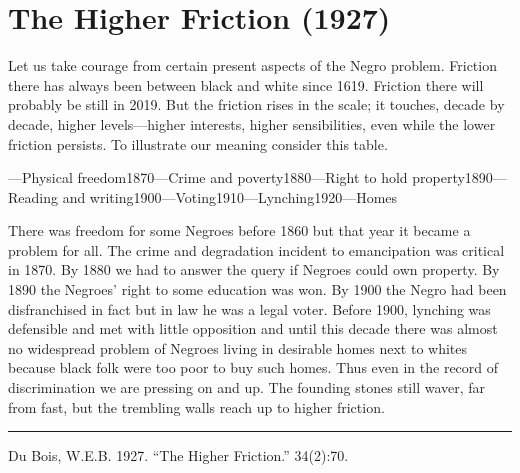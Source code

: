 \documentclass[letterpaper,10pt,english]{jupyterBook}
\begin{document}
\section{The Higher Friction (1927)}
\label{\detokenize{Volumes/34/02/higher_friction:the-higher-friction-1927}}\label{\detokenize{Volumes/34/02/higher_friction::doc}}
\sphinxAtStartPar
Let us take courage from certain present aspects of the Negro problem. Friction there has always been between black and white since 1619. Friction there will probably be still in 2019. But the friction rises in the scale; it touches, decade by decade, higher levels—higher interests, higher sensibilities, even while the lower friction persists. To illustrate our meaning consider this table.

—Physical freedom1870—Crime and poverty1880—Right to hold property1890—Reading and writing1900—Voting1910—Lynching1920—Homes

\sphinxAtStartPar
There was freedom for some Negroes before 1860 but that year it became a problem for all. The crime and degradation incident to emancipation was critical in 1870. By 1880 we had to answer the query if Negroes could own property. By 1890 the Negroes’ right to some education was won. By 1900 the Negro had been disfranchised in fact but in law he was a legal voter. Before 1900, lynching was defensible and met with little opposition and until this decade there was almost no wide\sphinxhyphen{}spread problem of Negroes living in desirable homes next to whites because black folk were too poor to buy such homes. Thus even in the record of discrimination we are pressing on and up. The founding stones still waver, far from fast, but the trembling walls reach up to higher friction.


\bigskip\hrule\bigskip


\sphinxAtStartPar
{} Du Bois, W.E.B. 1927. “The Higher Friction.”  34(2):70.
\end{document}
